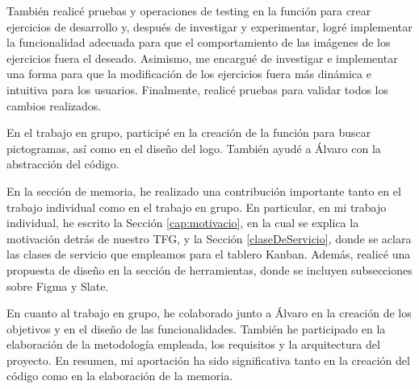 También realicé pruebas y operaciones de testing en la función para crear ejercicios de desarrollo y, después de investigar y experimentar, logré implementar la funcionalidad adecuada para que el comportamiento de las imágenes de los ejercicios fuera el deseado. Asimismo, me encargué de investigar e implementar una forma para que la modificación de los ejercicios fuera más dinámica e intuitiva para los usuarios. Finalmente, realicé pruebas para validar todos los cambios realizados.

En el trabajo en grupo, participé en la creación de la función para buscar pictogramas, así como en el diseño del logo. También ayudé a Álvaro con la abstracción del código.

En la sección de memoria, he realizado una contribución importante tanto en el trabajo individual como en el trabajo en grupo. En particular, en mi trabajo individual, he escrito la Sección \ref{cap:motivacio}, en la cual se explica la motivación detrás de nuestro TFG, y la Sección \ref{claseDeServicio}, donde se aclara las clases de servicio que empleamos para el tablero Kanban. Además, realicé una propuesta de diseño en la sección de herramientas, donde se incluyen subsecciones sobre Figma y Slate.

En cuanto al trabajo en grupo, he colaborado junto a Álvaro en la creación de los objetivos y en el diseño de las funcionalidades. También he participado en la elaboración de la metodología empleada, los requisitos y la arquitectura del proyecto. En resumen, mi aportación ha sido significativa tanto en la creación del código como en la elaboración de la memoria.